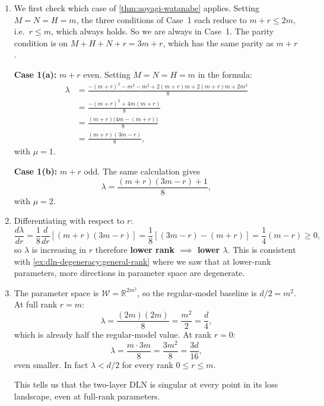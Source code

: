 \documentclass[11pt]{article}
\newcommand{\R}{\mathbb{R}}
\newcommand{\W}{\mathcal{W}}
\begin{document}
\begin{solution}[ex:dln-lc]
\begin{enumerate}
    \item
        We first check which case of \cref{thm:aoyagi-watanabe} applies.
        Setting $M = N = H = m$, the three conditions of Case~1 each reduce to
        $m + r \leq 2m$, i.e.\ $r \leq m$, which always holds. So we are always
        in Case~1. The parity condition is on $M + H + N + r = 3m + r$, which
        has the same parity as $m + r$.

        \textbf{Case 1(a):} $m + r$ even. Setting $M = N = H = m$ in the
        formula:
        \begin{align*}
            \lambda
            &= \frac{-(m+r)^2 - m^2 - m^2 + 2(m+r)m + 2(m+r)m + 2m^2}{8} \\
            &= \frac{-(m+r)^2 + 4m(m+r)}{8} \\
            &= \frac{(m+r)\bigl(4m - (m+r)\bigr)}{8} \\
            &= \frac{(m+r)(3m-r)}{8},
        \end{align*}
        with $\mu = 1$.

        \textbf{Case 1(b):} $m + r$ odd. The same calculation gives
        \[
            \lambda = \frac{(m+r)(3m - r) + 1}{8},
        \]
        with $\mu = 2$.

    \item
         Differentiating with respect to $r$:
        \[
            \frac{d\lambda}{dr}=\frac{1}{8}\frac{d}{dr}\!\left[(m+r)(3m-r)\right]
            = \frac{1}{8}\left[(3m - r) - (m + r)\right] = \frac{1}{4}(m - r) \geq 0,
        \]
        so $\lambda$ is increasing in $r$ therefore \textbf{lower rank
        $\implies$ lower $\lambda$}. This is consistent with
        \cref{ex:dln-degeneracy:general-rank} where we saw that at lower-rank
        parameters, more directions in parameter space are degenerate.

    \item
        The parameter space is $\W = \R^{2m^2}$, so the regular-model baseline
        is $d/2 = m^2$. At full rank $r = m$:
        \[
            \lambda = \frac{(2m)(2m)}{8} = \frac{m^2}{2} = \frac{d}{4},
        \]
        which is already half the regular-model value. At rank $r = 0$:
        \[
            \lambda = \frac{m \cdot 3m}{8} = \frac{3m^2}{8} = \frac{3d}{16},
        \]
        even smaller. In fact $\lambda < d/2$ for every rank $0 \leq r \leq m$.

        This tells us that the two-layer DLN is singular at every point in its
        loss landscape, even at full-rank parameters.
\end{enumerate}
\end{solution}
\end{document}
